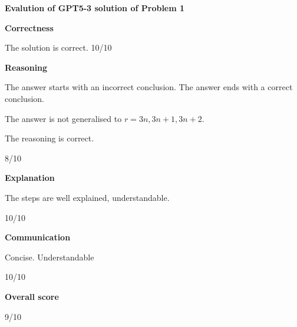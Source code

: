 \documentclass{article}
\begin{document}
{\bf Evalution of GPT5-3 solution of Problem 1}

{\bf Correctness}

The solution is correct. 10/10

{\bf Reasoning}

The answer starts with an incorrect conclusion. The answer ends with a correct conclusion.

The answer is not generalised to $r=3n, 3n+1, 3n+2$.

The reasoning is correct.

8/10

{\bf Explanation}

The steps are well explained, understandable.

10/10

{\bf Communication}

Concise. Understandable

10/10

{\bf Overall score}

9/10
\end{document}

